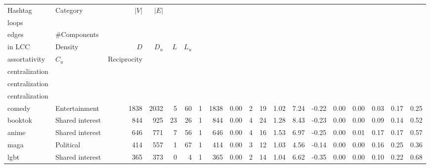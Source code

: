 \begin{tabular}{llrrrrrrrrrrrrrrrrr}
\toprule
         Hashtag &        Category &  $|V|$ &  $|E|$ &  \makecell{\#Self-\\ loops} &  \makecell{\#Multi-\\ edges} &  \#Components &  \makecell{$|V|$\\ in LCC} &  Density &  $D$ &  $D_u$ &  $L$ &  $L_u$ &  \makecell{Degree\\ assortativity} &  $C_u$ &  Reciprocity &  \makecell{Degree\\ centralization} &  \makecell{Closeness\\ centralization} &  \makecell{Betweenness\\ centralization} \\
\midrule
          comedy &   Entertainment &   1838 &   2032 &                           5 &                           60 &             1 &                       1838 &     0.00 &    2 &     19 & 1.02 &   7.24 &                              -0.22 &   0.00 &         0.00 &                                0.03 &                                   0.17 &                                     0.25 \\
         booktok & Shared interest &    844 &    925 &                          23 &                           26 &             1 &                        844 &     0.00 &    4 &     24 & 1.28 &   8.43 &                              -0.23 &   0.00 &         0.00 &                                0.09 &                                   0.14 &                                     0.52 \\
           anime & Shared interest &    646 &    771 &                           7 &                           56 &             1 &                        646 &     0.00 &    4 &     16 & 1.53 &   6.97 &                              -0.25 &   0.00 &         0.01 &                                0.17 &                                   0.17 &                                     0.57 \\
            maga &       Political &    414 &    557 &                           1 &                           67 &             1 &                        414 &     0.00 &    3 &     12 & 1.03 &   4.56 &                              -0.14 &   0.00 &         0.00 &                                0.16 &                                   0.25 &                                     0.36 \\
            lgbt & Shared interest &    365 &    373 &                           0 &                            4 &             1 &                        365 &     0.00 &    2 &     14 & 1.04 &   6.62 &                              -0.35 &   0.00 &         0.00 &                                0.10 &                                   0.22 &                                     0.68 \\

\end{tabular}
